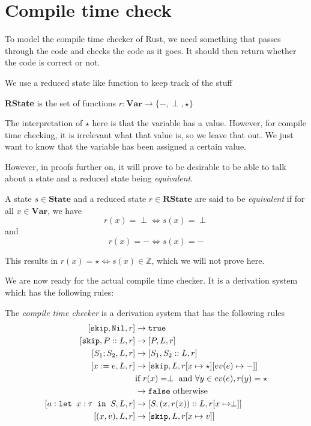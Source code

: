 \section{Compile time check}
To model the compile time checker of Rust, we need something that passes through the code and checks the code as it goes. It should then return whether the code is correct or not. 

We use a reduced state like function to keep track of the stuff

\begin{definition}
\textbf{RState} is the set of functions $r: \textbf{Var} \to \{-, \perp, \star \}$
\end{definition}

The interpretation of $\star$ here is that the variable has a value. However, for compile time checking, it is irrelevant what that value is, so we leave that out. We just want to know that the variable has been assigned a certain value.

However, in proofs further on, it will prove to be desirable to be able to talk about a state and a reduced state being \emph{equivalent}.

\begin{definition}
A state $s\in\textbf{State}$ and a reduced state $r\in\textbf{RState}$ are said to be \emph{equivalent} if for all $x\in\textbf{Var}$, we have 
$$r(x) = \perp \iff s(x) = \perp$$
and
$$r(x) = - \iff s(x) = -$$
\end{definition}

This results in $r(x) = \star \iff s(x)\in \mathbb{Z}$, which we will not prove here. 

We are now ready for the actual compile time checker. It is a derivation system which has the following rules:

\begin{definition}
\label{compiletimechecker}
The \emph{compile time checker} is a derivation system that has the following rules
\begin{align*}
\cc{\texttt{skip}}{\texttt{Nil}}{r} & \to \texttt{true}  \\
\cc{\texttt{skip}} {P::L}{ r}       & \to \cc{P}{L}{r}  \\
\cc{S_1; S_2}{L}{r}                 & \to \cc{S_1}{S_2::L}{r}  \\
\cc{x:=e}{L}{r}                     & \to \cc{\texttt{skip}}{L}{r[x\mapsto \star][ev(e) \mapsto -]} \\
                                    & \textrm{if }r(x) = \perp \textrm{ and } \forall y \in ev(e), r(y) = \star \\
                                    & \to \texttt{false} \textrm{ otherwise}\\
\cc{\letm{x}{S}}{L}{r} & \to \cc{S}{(x,r(x))::L}{r[x\mapsto \perp]} \\
\cc{(x,v)}{L}{r}                    & \to \cc{\texttt{skip}}{L}{r[x \mapsto v]}
\end{align*}
\end{definition}

